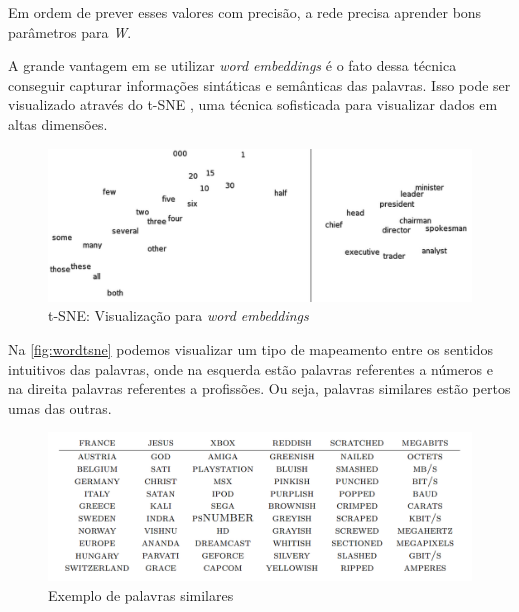 Em ordem de prever esses valores com precisão, a rede precisa aprender bons parâmetros para \textit{W}.

A grande vantagem em se utilizar \textit{word embeddings} é o fato dessa técnica conseguir capturar informações sintáticas e semânticas das palavras. Isso pode ser visualizado através do t-SNE \cite{van2008visualizing}, uma técnica sofisticada para visualizar dados em altas dimensões.

\begin{figure}[htb]
  \caption{t-SNE: Visualização para \textit{word embeddings}}\label{fig:wordtsne}
  \begin{center}
      \includegraphics[scale=0.25]{img/Turian-WordTSNE}
  \end{center}
\end{figure}

Na \autoref{fig:wordtsne} podemos visualizar um tipo de mapeamento entre os sentidos intuitivos das palavras, onde na esquerda estão palavras referentes a números e na direita palavras referentes a profissões. Ou seja, palavras similares estão pertos umas das outras.

\begin{figure}[htb]
  \caption{Exemplo de palavras similares}\label{fig:palavrassimilares}
  \begin{center}
      \includegraphics[scale=0.25]{img/Colbert-WordTable2}
  \end{center}
\end{figure}

